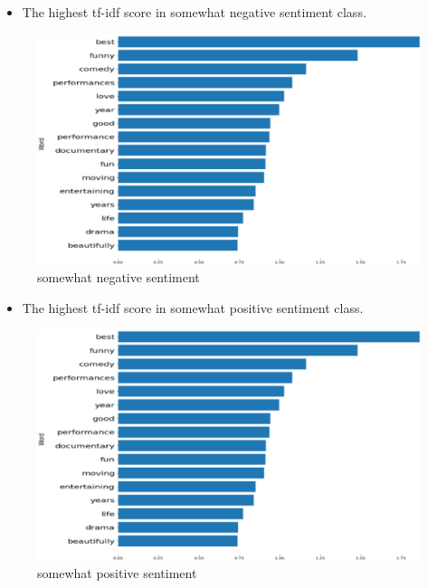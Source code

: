 \documentclass[
 size=14pt,
 paper=smartboard,  %
 mode=present, 		%
 display=slides, 	%
 style=tuliplab,  	%
 pauseslide,
 fleqn,leqno]{powerdot}
\begin{document}
  \begin{slide}[toc=,bm=]{}
    \twocolumn
    {
      
    \begin{itemize}
    \item
    \smallskip
    The highest tf-idf score in somewhat negative sentiment class.
  
   \end{itemize}
    \vspace{0.75cm}
    \begin{figure}
      \centering
      \includegraphics[width=1.0\textwidth,natwidth=840,natheight=550]{figures/sns.eps}
      \caption{somewhat negative sentiment}\label{Checking for outliers}
    \end{figure}
    }
    {
    
    \begin{itemize}
    \item
    The highest tf-idf score in somewhat positive sentiment class.
    
  
    \end{itemize}
    \bigskip
    \begin{figure}
      \centering
      \includegraphics[width=1.0\textwidth,natwidth=840,natheight=550]{figures/sps.eps}
      \caption{somewhat positive sentiment}\label{Checking for outliers}
    \end{figure}
    }
    

\end{slide}
\end{document}
